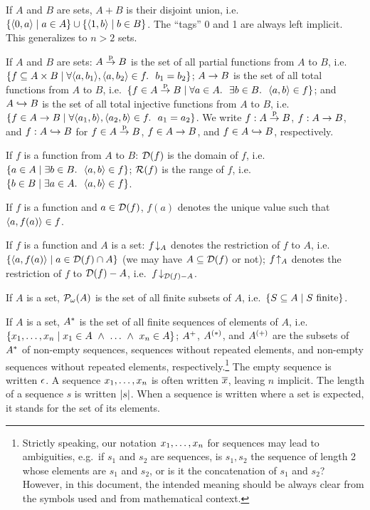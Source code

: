 If $A$ and $B$ are sets, $A+B$ is their disjoint union, i.e.\
$\{\langle0,a\rangle\mid a\in A\}\cup\{\langle1,b\rangle\mid b\in B\}$. The ``tags'' 0
and 1 are always left implicit. This generalizes to $n>2$ sets.

If $A$ and $B$ are sets: $A\stackrel{\mathrm{p}}{\to}B$ is the set of all partial functions
from $A$ to $B$, i.e.\ $\{f\subseteq A\times
B\mid\forall\langle a,b_1\rangle,\langle a,b_2\rangle\in f.\ \ b_1=b_2\}$; $A\to B$ is
the set of all total functions from $A$ to $B$, i.e.\
$\{f\in A\stackrel{\mathrm{p}}{\to}B\mid\forall a\in A.\ \ \exists b\in B.\ \ \langle a,b\rangle\in
f\}$;
and $A\hookrightarrow B$ is the set of all total injective functions from $A$ to
$B$, i.e.\ $\{f\in A\to B\mid\forall\langle a_1,b\rangle,\langle a_2,b\rangle\in
f.\ \ a_1=a_2\}$.
We write $f:A\stackrel{\mathrm{p}}{\to}B$, $f:A\to B$,
and $f:A\hookrightarrow B$ for $f\in A\stackrel{\mathrm{p}}{\to}B$, $f\in A\to B$,
and $f\in A\hookrightarrow B$, respectively.

If $f$ is a function from $A$ to $B$: $\mathcal{D}(f)$ is the domain of $f$, i.e.\
$\{a\in A\mid\exists b\in B.\ \ \langle a,b\rangle\in f\}$; $\mathcal{R}(f)$ is the range
of $f$, i.e.\ $\{b\in B\mid\exists a\in A.\ \ \langle a,b\rangle\in f\}$.

If $f$ is a function and $a\in\mathcal{D}(f)$, $f(a)$ denotes the unique value such
that $\langle a,f(a)\rangle\in f$.

If $f$ is a function and $A$ is a set: $f\!\downarrow_{A}$ denotes the
restriction of $f$ to $A$, i.e.\ $\{\langle a,f(a)\rangle\mid a\in\mathcal{D}(f)\cap A\}$
(we may have $A\subseteq\mathcal{D}(f)$ or not); $f\!\uparrow_{A}$ denotes the
restriction of $f$ to $\mathcal{D}(f)-A$, i.e.\ $f\!\downarrow_{\mathcal{D}(f)-A}$.

If $A$ is a set, $\mathcal{P}_\omega(A)$ is the set of all finite subsets of $A$, i.e.\
$\{S\subseteq A\mid S\mbox{ finite}\}$.

If $A$ is a set, $A^\ast$ is the set of all finite sequences of elements of
$A$, i.e.\ $\{x_1,\ldots,x_n\mid x_1\in A\ \wedge\ \ldots\ \wedge\  x_n\in A\}$;
$A^+$, $A^{(\ast)}$, and $A^{(+)}$ are the subsets of $A^\ast$ of
non-empty sequences, sequences without repeated elements, and non-empty
sequences without repeated elements, respectively.\footnote{Strictly speaking,
our notation $x_1,\ldots,x_n$ for sequences may lead to ambiguities, e.g.\
if $s_1$ and $s_2$ are sequences, is $s_1,s_2$ the sequence of length 2 whose
elements are $s_1$ and $s_2$, or is it the concatenation of $s_1$ and $s_2$?
However, in this document, the intended meaning should be always clear from
the symbols used and from mathematical context.} The empty sequence is written
$\epsilon$. A sequence $x_1,\ldots,x_n$ is often written $\overline{x}$, leaving $n$
implicit. The length of a sequence $s$ is written $|s|$.  When a
sequence is written where a set is expected, it stands for the set of its
elements.
